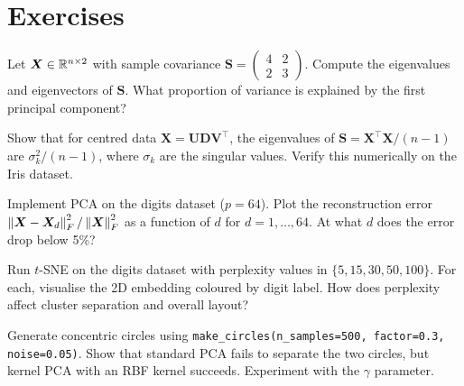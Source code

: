 \section{Exercises}

\begin{exercise}
Let $\bm{X}\in\mathbb{R}^{n\times 2}$ with sample covariance $\bm{S}=\begin{pmatrix}4 & 2\\2 & 3\end{pmatrix}$. Compute the eigenvalues and eigenvectors of $\bm{S}$. What proportion of variance is explained by the first principal component?
\end{exercise}

\begin{exercise}
Show that for centred data $\bm{X}=\bm{U}\bm{D}\bm{V}^\top$, the eigenvalues of $\bm{S}=\bm{X}^\top\bm{X}/(n-1)$ are $\sigma_k^2/(n-1)$, where $\sigma_k$ are the singular values. Verify this numerically on the Iris dataset.
\end{exercise}

\begin{exercise}
Implement PCA on the digits dataset ($p=64$). Plot the reconstruction error $\left\| \bm{X}-\bm{X}_d \right\|_F^2/\left\| \bm{X} \right\|_F^2$ as a function of $d$ for $d=1,\dots,64$. At what $d$ does the error drop below 5\%?
\end{exercise}

\begin{exercise}
Run $t$-SNE on the digits dataset with perplexity values in $\{5, 15, 30, 50, 100\}$. For each, visualise the 2D embedding coloured by digit label. How does perplexity affect cluster separation and overall layout?
\end{exercise}

\begin{exercise}
Generate concentric circles using \texttt{make\_circles(n\_samples=500, factor=0.3, noise=0.05)}. Show that standard PCA fails to separate the two circles, but kernel PCA with an RBF kernel succeeds. Experiment with the $\gamma$ parameter.
\end{exercise}
